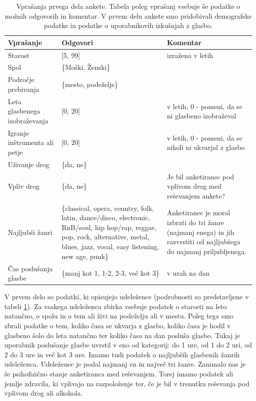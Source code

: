 \documentclass[a4paper, 12pt]{book}
\begin{document}
{\begin{table}[!hbt]
\begin{center}
\caption{Vprašanja prvega dela ankete. Tabela poleg vprašanj vsebuje še podatke o možnih odgovorih in komentar. V prvem delu ankete smo pridobivali demografske podatke in podatke o uporabnikovih izkušnjah z glasbo.}
\begin{tabular}{| p{3.5cm} | p{4.5cm} | p{4.5cm} |}
\hline
Vprašanje & Odgovori & Komentar \\ \hline \hline
Starost & [5, 99] & izražena v letih \\ \hline
Spol & \{Moški, Ženski\} & \\ \hline
Področje prebivanja & \{mesto, podeželje\} & \\ \hline
Leta glasbenega izobraževanja & [0, 20] & v letih, 0 - pomeni, da se ni glasbeno izobraževal \\ \hline
Igranje inštrumenta ali petje & [0, 20] & v letih, 0 - pomeni, da se nikoli ni ukvarjal z glasbo \\ \hline
Uživanje drog & \{da, ne\} & \\ \hline
Vpliv drog & \{da, ne\} &  Je bil anketiranec pod vplivom drog med reševanjem ankete? \\ \hline
Najljubši žanri & \{classical, opera, country, folk, latin, dance/disco, electronic, RnB/soul, hip hop/rap, reggae, pop, rock, alternative, metal, blues, jazz, vocal, easy listening, new age, punk\} & Anketiranec je moral izbrati do tri žanre (najmanj enega) in jih razvrstiti od najljubšega do najmanj priljubljenega. \\ \hline
Čas poslušanja glasbe & \{manj kot 1, 1-2, 2-3, več kot 3\} & v urah na dan \\ \hline

\end{tabular}
\label{prvidel}
\end{center}
\end{table} 

V prvem delo so podatki, ki opisujejo udeležence (podrobnosti so predstavljene v tabeli \ref{prvidel}). Za vsakega udeleženca zbirka vsebuje podatek o starosti na leto natančno, o spolu in o tem ali živi na podeželju ali v mestu. Poleg tega smo zbrali podatke o tem, koliko časa se ukvarja z glasbo, koliko časa je hodil v glasbeno šolo do leta natančno ter koliko časa na dan posluša glasbo. Tukaj je uporabnik poslušanje glasbe uvrstil v eno od kategorij: do 1 ure, od 1 do 2 uri, od 2 do 3 ure in več kot 3 ure. Imamo tudi podatek o najljubših glasbenih žanrih udeleženca. Udeleženec je podal najmanj en in največ tri žanre. Zanimalo nas je še psihofizično stanje anketiranca med reševanjem. Torej imamo podatek ali jemlje zdravila, ki vplivajo na razpoloženje ter, če je bil v trenutku reševanja pod vplivom drog ali alkohola. 

}
\end{document}
